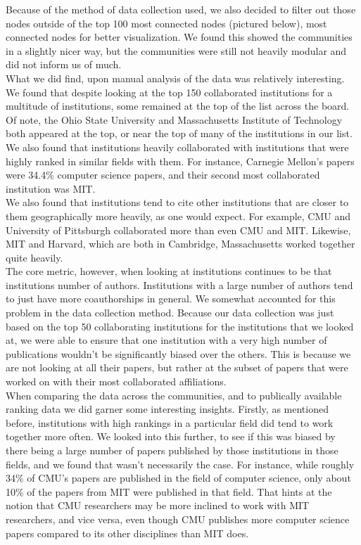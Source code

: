 \documentclass[times, 10pt,twocolumn]{article}
\begin{document}
Because of the method of data collection used, we also decided to filter out those nodes outside of the top 100 most connected nodes (pictured below), most connected nodes for better visualization.  We found this showed the communities in a slightly nicer way, but the communities were still not heavily modular and did not inform us of much.    \\

What we did find, upon manual analysis of the data was relatively interesting. We found that despite looking at the top 150 collaborated institutions for a multitude of institutions, some remained at the top of the list across the board. Of note, the Ohio State University and Massachusetts Institute of Technology both appeared at the top, or near the top of many of the institutions in our list. We also found that institutions heavily collaborated with institutions that were highly ranked in similar fields with them. For instance, Carnegie Mellon’s papers were 34.4\% computer science papers, and their second most collaborated institution was MIT. \\

We also found that institutions tend to cite other institutions that are closer to them geographically more heavily, as one would expect. For example, CMU and University of Pittsburgh collaborated more than even CMU and MIT. Likewise, MIT and Harvard, which are both in Cambridge, Massachusetts worked together quite heavily. \\

The core metric, however, when looking at institutions continues to be that institutions number of authors. Institutions with a large number of authors tend to just have more coauthorships in general.  We somewhat accounted for this problem in the data collection method. Because our data collection was just based on the top 50 collaborating institutions for the institutions that we looked at, we were able to ensure that one institution with a very high number of publications wouldn’t be significantly biased over the others. This is because we are not looking at all their papers, but rather at the subset of papers that were worked on with their most collaborated affiliations. \\

When comparing the data across the communities, and to publically available ranking data we did garner some interesting insights. Firstly, as mentioned before, institutions with high rankings in a particular field did tend to work together more often. We looked into this further, to see if this was biased by there being a large number of papers published by those institutions in those fields, and we found that wasn’t necessarily the case. For instance, while roughly 34\% of CMU’s papers are published in the field of computer science, only about 10\% of the papers from MIT were published in that field. That hints at the notion that CMU researchers may be more inclined to work with MIT researchers, and vice versa, even though CMU publishes more computer science papers compared to its other disciplines than MIT does. \\
\end{document}
